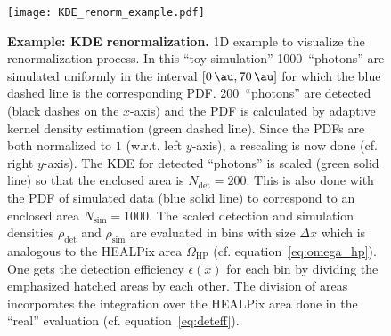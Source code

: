 \begin{figure}[H]
	\centering
	\texttt{[image: KDE\_renorm\_example.pdf]}
	\caption[Example: KDE renormalization]{\textbf{Example: KDE renormalization.} 1D example to visualize the renormalization process. In this \enquote{toy simulation} \num{1000}~\enquote{photons} are simulated uniformly in the interval $[\SI{0}{\au},\SI{70}{\au}]$ for which the blue dashed line is the corresponding PDF. \num{200}~\enquote{photons} are detected (black dashes on the $x$-axis) and the PDF is calculated by adaptive kernel density estimation (green dashed line). Since the PDFs are both normalized to $1$ (w.r.t. left $y$-axis), a rescaling is now done (cf. right $y$-axis). The KDE for detected \enquote{photons} is scaled (green solid line) so that the enclosed area is $N_\text{det}=\num{200}$. This is also done with the PDF of simulated data (blue solid line) to correspond to an enclosed area $N_\text{sim}=\num{1000}$. The scaled detection and simulation densities $\rho_\text{det}$ and $\rho_\text{sim}$ are evaluated in bins with size $\Delta x$ which is analogous to the HEALPix area $\Omega_\text{HP}$ (cf. equation~\eqref{eq:omega_hp}). One gets the detection efficiency $\epsilon(x)$ for each bin by dividing the emphasized hatched areas by each other. The division of areas incorporates the integration over the HEALPix area done in the \enquote{real} evaluation (cf. equation~\eqref{eq:deteff}).}
	\label{deteff:1d_example}	
\end{figure}


